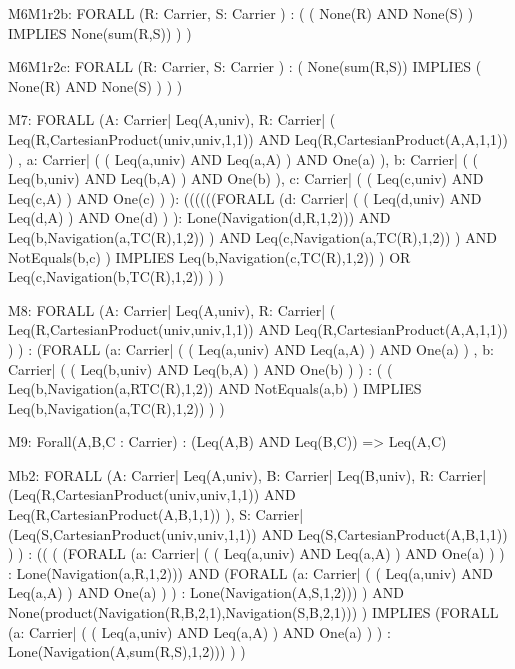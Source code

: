 \begin{verbnobox}[\tiny]
M6M1r2b:
	FORALL (R: Carrier, S: Carrier ) :  (  ( None(R) AND None(S) )  IMPLIES None(sum(R,S)) ) )
\end{verbnobox}

\begin{verbnobox}[\tiny]
M6M1r2c:
	FORALL (R: Carrier, S: Carrier ) :  (  None(sum(R,S)) IMPLIES ( None(R) AND None(S) ) ) )
\end{verbnobox}

\begin{verbnobox}[\tiny]
M7:
	FORALL (A: Carrier| Leq(A,univ),
		   R: Carrier|  ( Leq(R,CartesianProduct(univ,univ,1,1)) AND Leq(R,CartesianProduct(A,A,1,1)) ) ,
		   a: Carrier|  (  ( Leq(a,univ) AND Leq(a,A) )  AND One(a) ),
		   b: Carrier|  (  ( Leq(b,univ) AND Leq(b,A) )  AND One(b) ),
		   c: Carrier|  (  ( Leq(c,univ) AND Leq(c,A) )  AND One(c) ) ):
		((((((FORALL (d: Carrier|  (  ( Leq(d,univ) AND Leq(d,A) )  AND One(d) ) ): Lone(Navigation(d,R,1,2)))
		AND 
			Leq(b,Navigation(a,TC(R),1,2)) ) AND 
			Leq(c,Navigation(a,TC(R),1,2)) )  AND NotEquals(b,c) ) 
	    IMPLIES Leq(b,Navigation(c,TC(R),1,2)) )  OR Leq(c,Navigation(b,TC(R),1,2)) ) )
\end{verbnobox}

\begin{verbnobox}[\tiny]
M8:
	FORALL (A: Carrier| Leq(A,univ), 
		   R: Carrier|  ( Leq(R,CartesianProduct(univ,univ,1,1)) AND Leq(R,CartesianProduct(A,A,1,1)) ) ) : 
    (FORALL (a: Carrier|  (  ( Leq(a,univ) AND Leq(a,A) )  AND One(a) ) , 
    		    b: Carrier|  (  ( Leq(b,univ) AND Leq(b,A) )  AND One(b) ) ) : 
    	    (  ( Leq(b,Navigation(a,RTC(R),1,2)) AND NotEquals(a,b) )
    			IMPLIES Leq(b,Navigation(a,TC(R),1,2)) ) )
\end{verbnobox}

\begin{verbnobox}[\tiny]
M9:
	Forall(A,B,C : Carrier) : (Leq(A,B) AND Leq(B,C)) => Leq(A,C)
\end{verbnobox}

\begin{verbnobox}[\tiny]
Mb2:
	FORALL (A: Carrier| Leq(A,univ), 
		   B: Carrier| Leq(B,univ), 
		   R: Carrier| (Leq(R,CartesianProduct(univ,univ,1,1)) AND Leq(R,CartesianProduct(A,B,1,1)) ),
		   S: Carrier| (Leq(S,CartesianProduct(univ,univ,1,1)) AND Leq(S,CartesianProduct(A,B,1,1)) ) ) :
	   (( ( (FORALL (a: Carrier|  (  ( Leq(a,univ) AND Leq(a,A) )  AND One(a) ) ) : 
			Lone(Navigation(a,R,1,2))) 
		    AND 
			(FORALL (a: Carrier|  (  ( Leq(a,univ) AND Leq(a,A) )  AND One(a) ) ) : 
				Lone(Navigation(A,S,1,2))) ) AND None(product(Navigation(R,B,2,1),Navigation(S,B,2,1))) 
	    )
		IMPLIES (FORALL (a: Carrier|  (  ( Leq(a,univ) AND Leq(a,A) )  AND One(a) ) ) : 
		    Lone(Navigation(A,sum(R,S),1,2))) ) )
\end{verbnobox}